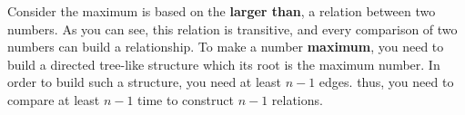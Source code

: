 Consider the maximum is based on the \textbf{larger than}, a relation between two numbers. As you can see, this relation is transitive,
 and every comparison of two numbers can build a relationship. To make a number \textbf{maximum}, you need to build a directed tree-like 
 structure which its root is the maximum number. In order to build such a structure, you need at least $n- 1$ edges. thus, you need to 
 compare at least $n-1$ time to construct $n-1$ relations. 
